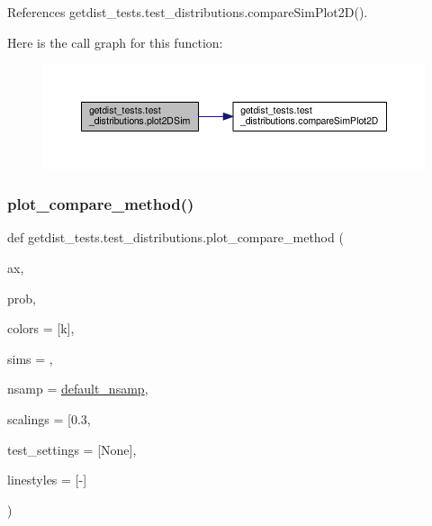References getdist\+\_\+tests.\+test\+\_\+distributions.\+compare\+Sim\+Plot2\+D().

Here is the call graph for this function\+:
\nopagebreak
\begin{figure}[H]
\begin{center}
\leavevmode
\includegraphics[width=350pt]{namespacegetdist__tests_1_1test__distributions_aef08c01dc3b9daf15ea7f11c2927610e_cgraph}
\end{center}
\end{figure}
\mbox{\label{namespacegetdist__tests_1_1test__distributions_ad9e34543b241b9b5e67b066b1f94d997}} 
\subsubsection{\texorpdfstring{plot\+\_\+compare\+\_\+method()}{plot\_compare\_method()}}
{\footnotesize\ttfamily def getdist\+\_\+tests.\+test\+\_\+distributions.\+plot\+\_\+compare\+\_\+method (\begin{DoxyParamCaption}\item[{}]{ax,  }\item[{}]{prob,  }\item[{}]{colors = {\ttfamily \mbox{[}\textquotesingle{}k\textquotesingle{}\mbox{]}},  }\item[{}]{sims = {},  }\item[{}]{nsamp = {\ttfamily \mbox{\hyperlink{namespacegetdist__tests_1_1test__distributions_af66b4064706bf88e0ed5378ff868fc39}{default\+\_\+nsamp}}},  }\item[{}]{scalings = {\ttfamily \mbox{[}0.3},  }\item[{}]{test\+\_\+settings = {\ttfamily \mbox{[}None\mbox{]}},  }\item[{}]{linestyles = {\ttfamily \mbox{[}\textquotesingle{}-\/\textquotesingle{}\mbox{]}} }\end{DoxyParamCaption})}



